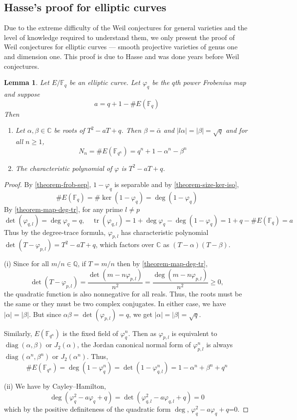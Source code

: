 \documentclass[12pt]{article}
\newtheorem{lemma}{Lemma}[subsection]
\theoremstyle{remark}
\theoremstyle{definition}
\newcommand{\F}[0]{\mathbb{F}}
\newcommand{\C}[0]{\mathbb{C}}
\begin{document}
    \subsection{Hasse's proof for elliptic curves}
        Due to the extreme difficulty of the Weil conjectures for general varieties and the level of knowledge required to understand them, we only present the proof of Weil conjectures for elliptic curves --- smooth projective varieties of genus one and dimension one. This proof is due to Hasse and was done years before Weil conjectures.
        \begin{lemma}\label{lemma-the-last}
            Let $E/\F_q$ be an elliptic curve. Let $\varphi_q$ be the $q$th power Frobenius map and suppose
            \[a=q+1-\# E(\F_q)\]
            Then
            \begin{enumerate}[\normalfont(i)]
                \item Let $\alpha,\beta\in\C$ be roots of $T^2-aT+q$. Then $\beta=\bar{\alpha}$ and $|l\alpha|=|\beta|=\sqrt{q}$ and for all $n\geqslant 1$,
                \[N_n=\# E(\F_{q^n})=q^n+1-\alpha^n-\beta^n\]
                \item The characteristic polynomial of $\varphi$ is $T^2-aT+q$.
            \end{enumerate}
        \end{lemma}
        \begin{proof}
            By \autoref{theorem-frob-sep}, $1-\varphi_q$ is separable and by \autoref{theorem-size-ker-iso},
            \[\# E(\F_q)=\#\ker(1-\varphi_q)=\deg(1-\varphi_q)\]
            By \autoref{theorem-map-deg-tr}, for any prime $l\neq p$
            \[\det(\varphi_{q,l})=\deg\varphi_q=q,\quad\operatorname{tr}(\varphi_{q,l})=1+\deg\varphi_q-\deg(1-\varphi_q)=1+q-\# E(\F_q)=a\]
            Thus by the degree-trace formula, $\varphi_{p,l}$ has characteristic polynomial $\det(T-\varphi_{p,l})=T^2-aT+q$, which factors over $\C$ as $(T-\alpha)(T-\beta)$.
            
            (i) Since for all $m/n\in\mathbb Q$, if $T=m/n$ then by \autoref{theorem-map-deg-tr},
            \[\det(T-\varphi_{p,l})=\frac{\det(m-n\varphi_{p,l})}{n^2}=\frac{\deg(m-n\varphi_{p,l})}{n^2}\geqslant 0,\]
            the quadratic function is also nonnegative for all reals. Thus, the roots must be the same or they must be two complex conjugates. In either case, we have $|\alpha|=|\beta|$. But since $\alpha\beta=\det(\varphi_{p,l})=q$, we get $|\alpha|=|\beta|=\sqrt{q}$.
            
            Similarly, $E(\F_{q^n})$ is the fixed field of $\varphi_{q}^n$. Then as $\varphi_{p,l}$ is equivalent to $\operatorname{diag}(\alpha,\beta)$ or $J_2(\alpha)$, the Jordan canonical normal form of $\varphi_{p,l}^n$ is always $\operatorname{diag}(\alpha^n,\beta^n)$ or $J_2(\alpha^n)$. Thus,
            \[\# E(\F_{q^n})=\deg(1-\varphi_{q}^n)=\det(1-\varphi_{q,l}^n)=1-\alpha^n+\beta^n+q^n\]
            
            (ii) We have by Cayley–Hamilton,
            \[\deg(\varphi_q^2-a\varphi_q+q)=\det(\varphi_{q,l}^2-a\varphi_{q,l}+q)=0\]
            which by the positive definiteness of the quadratic form $\deg$, $\varphi_q^2-a\varphi_q+q$=0.
        \end{proof}
\end{document}
